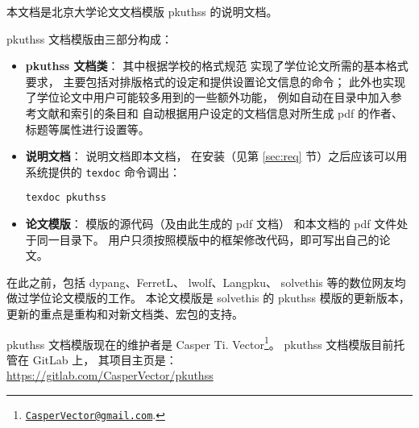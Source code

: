 %
%
%
%


本文档是北京大学论文文档模版 pkuthss 的说明文档。

pkuthss 文档模版由三部分构成：
\begin{itemize}
	\item \textbf{pkuthss 文档类}：
		其中根据学校的格式规范%
		实现了学位论文所需的基本格式要求，
		主要包括对排版格式的设定和提供设置论文信息的命令；
		此外也实现了学位论文中用户可能较多用到的一些额外功能，
		例如自动在目录中加入参考文献和索引的条目和
		自动根据用户设定的文档信息对所生成 pdf 的作者、标题等属性进行设置等。
	\item \textbf{说明文档}：
		说明文档即本文档，
		在安装（见第 \ref{sec:req} 节）之后应该可以用  系统提供的
		\verb|texdoc| 命令调出：
\begin{Verbatim}
texdoc pkuthss
\end{Verbatim}
	\item \textbf{论文模版}：
		模版的源代码（及由此生成的 pdf 文档）
		和本文档的 pdf 文件处于同一目录下。
		用户只须按照模版中的框架修改代码，即可写出自己的论文。
\end{itemize}

在此之前，包括 dypang、FerretL\supercite{FerretL}、%
lwolf、Langpku\supercite{Langpku}、%
solvethis 等的数位网友均做过学位论文模版的工作。
本论文模版是 solvethis 的 pkuthss 模版的更新版本，
更新的重点是重构和对新文档类、宏包的支持。

pkuthss 文档模版现在的维护者是 Casper Ti. Vector\footnote%
{\href{mailto:CasperVector@gmail.com}{\texttt{CasperVector@gmail.com}}.}。%
pkuthss 文档模版目前托管在 GitLab 上，
其项目主页是：\\
\hspace*{\parindent}\url{https://gitlab.com/CasperVector/pkuthss}

